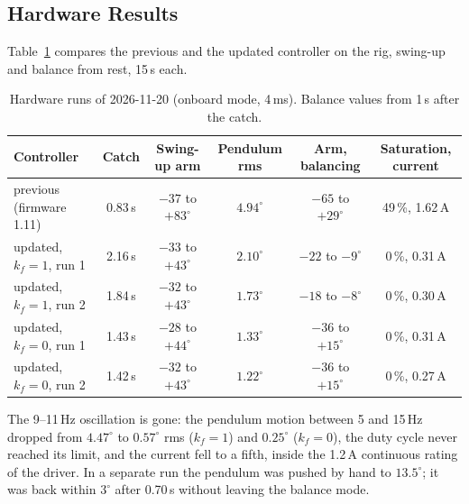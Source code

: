 \documentclass[a4paper,11pt]{article}
\begin{document}
\subsection{Hardware Results}
\label{sec:cu_rig}
Table~\ref{tab:cu_rig} compares the previous and the updated controller on the rig, swing-up and balance from rest, 15\,s each.

\begin{table}[h]
\centering
\caption{Hardware runs of 2026-11-20 (onboard mode, 4\,ms). Balance values from 1\,s after the catch.}
\label{tab:cu_rig}
\footnotesize
\begin{tabular}{@{}lccccc@{}}
\toprule
Controller & Catch & Swing-up arm & Pendulum rms & Arm, balancing & Saturation, current \\
\midrule
previous (firmware 1.11) & 0.83\,s & $-37$ to $+83^\circ$ & $4.94^\circ$ & $-65$ to $+29^\circ$ & 49\,\%, 1.62\,A \\
updated, $k_f = 1$, run 1 & 2.16\,s & $-33$ to $+43^\circ$ & $2.10^\circ$ & $-22$ to $-9^\circ$ & 0\,\%, 0.31\,A \\
updated, $k_f = 1$, run 2 & 1.84\,s & $-32$ to $+43^\circ$ & $1.73^\circ$ & $-18$ to $-8^\circ$ & 0\,\%, 0.30\,A \\
updated, $k_f = 0$, run 1 & 1.43\,s & $-28$ to $+44^\circ$ & $1.33^\circ$ & $-36$ to $+15^\circ$ & 0\,\%, 0.31\,A \\
updated, $k_f = 0$, run 2 & 1.42\,s & $-32$ to $+43^\circ$ & $1.22^\circ$ & $-36$ to $+15^\circ$ & 0\,\%, 0.27\,A \\
\bottomrule
\end{tabular}
\end{table}

The 9--11\,Hz oscillation is gone: the pendulum motion between 5 and 15\,Hz dropped from $4.47^\circ$ to $0.57^\circ$ rms ($k_f = 1$) and $0.25^\circ$ ($k_f = 0$), the duty cycle never reached its limit, and the current fell to a fifth, inside the 1.2\,A continuous rating of the driver. In a separate run the pendulum was pushed by hand to $13.5^\circ$; it was back within $3^\circ$ after 0.70\,s without leaving the balance mode.
\end{document}
